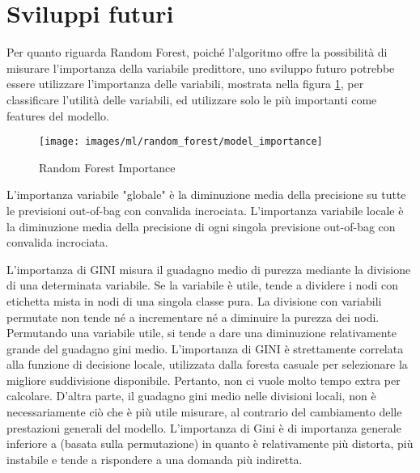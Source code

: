 \section{Sviluppi futuri}

Per quanto riguarda Random Forest, poiché l'algoritmo offre la possibilità di 
misurare l’importanza della variabile predittore, uno sviluppo futuro potrebbe 
essere utilizzare l'importanza delle variabili, mostrata nella figura 
\ref{fig:rf_importance}, per classificare l'utilità delle variabili, ed 
utilizzare solo le più importanti come features del modello. 

\begin{figure}[H]
	\centering
	\texttt{[image: images/ml/random\_forest/model\_importance]}
	\caption{Random Forest Importance}
	\label{fig:rf_importance}
\end{figure}

L'importanza variabile "globale" è la diminuzione media della precisione su 
tutte le previsioni out-of-bag con convalida incrociata. 
L'importanza variabile locale è la diminuzione media della precisione 
di ogni singola previsione out-of-bag con convalida incrociata. 

L'importanza di GINI misura il guadagno medio di purezza mediante la 
divisione di una determinata variabile. Se la variabile è utile, tende a 
dividere i nodi con etichetta mista in nodi di una singola classe pura. La 
divisione con variabili permutate non tende né a incrementare né a diminuire la 
purezza dei nodi. 
Permutando una variabile utile, si tende a dare una diminuzione relativamente 
grande del guadagno gini medio. L'importanza di GINI è strettamente correlata 
alla funzione di decisione locale, utilizzata dalla foresta casuale per 
selezionare la migliore suddivisione disponibile. Pertanto, non ci vuole molto 
tempo extra per calcolare. D'altra parte, il guadagno gini medio nelle 
divisioni locali, non è necessariamente ciò che è più utile misurare, al 
contrario del cambiamento delle prestazioni generali del modello. 
L'importanza di Gini è di importanza generale inferiore a (basata sulla 
permutazione) in quanto è relativamente più distorta, più instabile e tende a 
rispondere a una domanda più indiretta.
